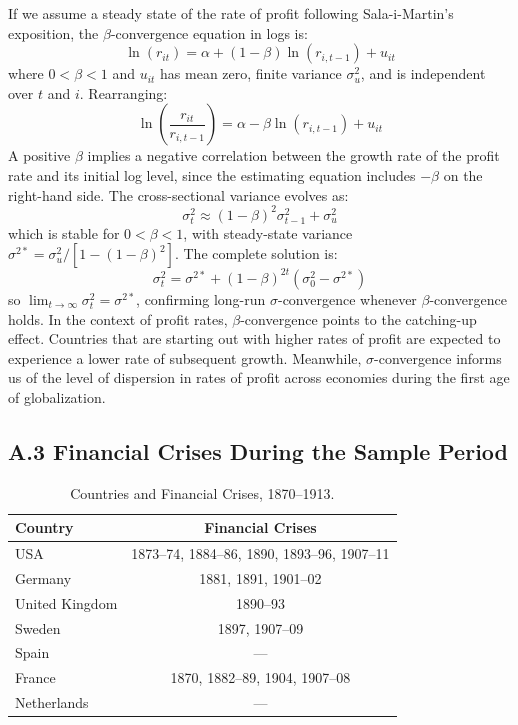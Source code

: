 \documentclass[10pt]{article}
\begin{document}
If we assume a steady state of the rate of profit following Sala-i-Martin's exposition, the $\beta$-convergence equation in logs is:
\begin{equation*}
\ln(r_{it}) = \alpha + (1-\beta)\ln(r_{i,t-1}) + u_{it}
\end{equation*}
where $0<\beta<1$ and $u_{it}$ has mean zero, finite variance $\sigma_u^2$, and is independent over $t$ and $i$. Rearranging:
\begin{equation*}
\ln\!\left(\frac{r_{it}}{r_{i,t-1}}\right) = \alpha - \beta\ln(r_{i,t-1}) + u_{it}
\end{equation*}
A positive $\beta$ implies a negative correlation between the growth rate of the profit rate and its initial log level, since the estimating equation includes $-\beta$ on the right-hand side. The cross-sectional variance evolves as:
\begin{equation*}
\sigma_t^2 \approx (1-\beta)^2\sigma_{t-1}^2 + \sigma_u^2
\end{equation*}
which is stable for $0<\beta<1$, with steady-state variance $\sigma^{2*} = \sigma_u^2 / [1-(1-\beta)^2]$. The complete solution is:
\begin{equation}
\sigma_t^2 = \sigma^{2*} + (1-\beta)^{2t}(\sigma_0^2 - \sigma^{2*})
\end{equation}
so $\lim_{t\to\infty}\sigma_t^2 = \sigma^{2*}$, confirming long-run $\sigma$-convergence whenever $\beta$-convergence holds. In the context of profit rates, $\beta$-convergence points to the catching-up effect. Countries that are starting out with higher rates of profit are expected to experience a lower rate of subsequent growth. Meanwhile, $\sigma$-convergence informs us of the level of dispersion in rates of profit across economies during the first age of globalization.

\subsection*{A.3 Financial Crises During the Sample Period}

\begin{table}[h]
  \centering
  \caption{Countries and Financial Crises, 1870--1913.}
  \label{tab:crises}
  \begin{tabular}{lc}
    \toprule
    \textbf{Country} & \textbf{Financial Crises} \\
    \midrule
    USA & 1873--74, 1884--86, 1890, 1893--96, 1907--11 \\
    Germany & 1881, 1891, 1901--02 \\
    United Kingdom & 1890--93 \\
    Sweden & 1897, 1907--09 \\
    Spain & --- \\
    France & 1870, 1882--89, 1904, 1907--08 \\
    Netherlands & --- \\
    \bottomrule
  \end{tabular}
\end{table}
\end{document}
